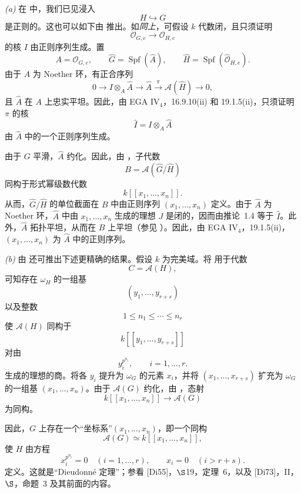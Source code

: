 \smallskip
\noindent\textit{(a)}
在  中，我们已见浸入
\[
  H\hookrightarrow G
\]
是正则的。这也可以如下由  推出。如\textit{同上}，可假设 \(k\) 代数闭，且只须证明
\[
  \mathcal O_{G,e}\longrightarrow\mathcal O_{H,e}
\]
的核 \(I\) 由正则序列生成。置
\[
  A=\mathcal O_{G,e},
  \qquad
  \widehat G=\operatorname{Spf}(\widehat A),
  \qquad
  \widehat H
  =
  \operatorname{Spf}(\widehat{\mathcal O}_{H,e}).
\]
由于 \(A\) 为 Noether 环，有正合序列
\[
  0
  \longrightarrow I\otimes_A\widehat A
  \longrightarrow \widehat A
  \xrightarrow{\ \pi\ }
  \mathscr A(\widehat H)
  \longrightarrow 0,
\]
且 \(\widehat A\) 在 \(A\) 上忠实平坦。因此，由 EGA IV\(_4\)，16.9.10(ii) 和 19.1.5(ii)，只须证明 \(\pi\) 的核
\[
  \widehat I=I\otimes_A\widehat A
\]
由 \(\widehat A\) 中的一个正则序列生成。

由于 \(G\) 平滑，\(\widehat A\) 约化。因此，由 ，子代数
\[
  B=\mathscr A(\widehat G/\widehat H)
\]
同构于形式幂级数代数
\[
  k[[x_1,\ldots,x_n]].
\]
从而，\(\widehat G/\widehat H\) 的单位截面在 \(B\) 中由正则序列 \((x_1,\ldots,x_n)\) 定义。由于 \(\widehat A\) 为 Noether 环，\(\widehat A\) 中由 \(x_1,\ldots,x_n\) 生成的理想 \(J\) 是闭的，因而由推论~1.4 等于 \(\widehat I\)。此外，\(\widehat A\) 拓扑平坦，从而在 \(B\) 上平坦\textup{（参见 ）}。因此，由 EGA IV\(_4\)，19.1.5(ii)，\((x_1,\ldots,x_n)\) 为 \(\widehat A\) 中的正则序列。

\smallskip
\noindent\textit{(b)}
由  还可推出下述更精确的结果。假设 \(k\) 为完美域。将  用于代数
\[
  C=\mathscr A(H),
\]
可知存在 \(\omega_H\) 的一组基
\[
  (y_1,\ldots,y_{r+s})
\]
以及整数
\[
  1\leq n_1\leq\cdots\leq n_r
\]
使 \(\mathscr A(H)\) 同构于
\[
  k[[y_1,\ldots,y_{r+s}]]
\]
对由
\[
  y_i^{p^{n_i}},
  \qquad i=1,\ldots,r.
\]
生成的理想的商。将各 \(y_i\) 提升为 \(\omega_G\) 的元素 \(x_i\)，并将 \((x_1,\ldots,x_{r+s})\) 扩充为 \(\omega_G\) 的一组基 \((x_1,\ldots,x_n)\)。由于 \(\mathscr A(G)\) 约化，由 ，态射
\[
  k[[x_1,\ldots,x_n]]
  \longrightarrow
  \mathscr A(G)
\]
为同构。

因此，\(G\) 上存在一个“坐标系”\((x_1,\ldots,x_n)\)，即一个同构
\[
  \mathscr A(G)
  \simeq
  k[[x_1,\ldots,x_n]],
\]
使 \(H\) 由方程
\[
  x_i^{p^{n_i}}=0
  \quad (i=1,\ldots,r),
  \qquad
  x_i=0
  \quad (i>r+s).
\]
定义。这就是“Dieudonn\'e 定理”；参看 \textup{[Di55]}，\(\S\)19，定理~6，以及 \textup{[Di73]}，II，\(\S\)，命题~3 及其前面的内容。

